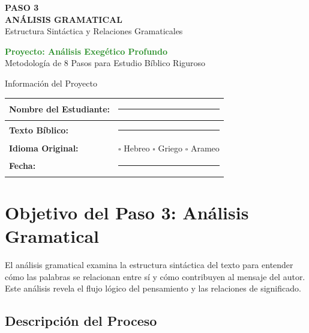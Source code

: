 \documentclass[11pt,a4paper]{article}
\begin{document}
\begin{center}
    {\Huge\color{forestgreen}\textbf{PASO 3}}\\[0.5cm]
    {\Large\color{sagegreen}\textbf{ANÁLISIS GRAMATICAL}}\\[0.3cm]
    {\large\color{papergray}Estructura Sintáctica y Relaciones Gramaticales}\\[1cm]
    
    \begin{tcolorbox}[colback=olivegreen!10, colframe=olivegreen, width=0.8\textwidth]
        \centering
        \textcolor{forestgreen}{\textbf{Proyecto: Análisis Exegético Profundo}}\\
        \textcolor{papergray}{Metodología de 8 Pasos para Estudio Bíblico Riguroso}
    \end{tcolorbox}
\end{center}

\vspace{1cm}

\begin{infobox}{Información del Proyecto}
\begin{tabularx}{\textwidth}{|X|X|}
\hline
\textbf{Nombre del Estudiante:} & \rule{6cm}{0.4pt} \\[0.8cm]
\hline
\textbf{Texto Bíblico:} & \rule{6cm}{0.4pt} \\[0.8cm]
\hline
\textbf{Idioma Original:} & $\square$ Hebreo \quad $\square$ Griego \quad $\square$ Arameo \\[0.8cm]
\hline
\textbf{Fecha:} & \rule{6cm}{0.4pt} \\[0.8cm]
\hline
\end{tabularx}
\end{infobox}

\section{Objetivo del Paso 3: Análisis Gramatical}

El análisis gramatical examina la estructura sintáctica del texto para entender cómo las palabras se relacionan entre sí y cómo contribuyen al mensaje del autor. Este análisis revela el flujo lógico del pensamiento y las relaciones de significado.

\subsection{Descripción del Proceso}
\end{document}
